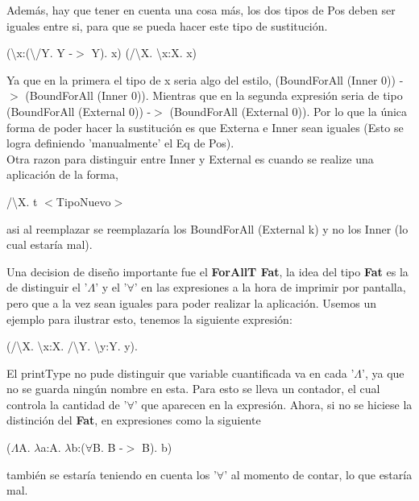 \documentclass[12pt, titlepage, a4paper]{article}
\begin{document}
\begin{itemize}[label=$\bullet$]
{  Además, hay que tener en cuenta una cosa más, los dos tipos de Pos deben ser iguales entre si, para que se pueda hacer este tipo 
  de sustitución.
  
  \begin{center}
    (\textbackslash x:(\textbackslash/Y. Y -$>$ Y). x) (/\textbackslash X. \textbackslash x:X. x)
  \end{center} 

  Ya que en la primera el tipo de x seria algo del estilo, (BoundForAll (Inner 0)) -$>$ (BoundForAll (Inner 0)). Mientras que en la segunda expresión seria 
  de tipo (BoundForAll (External 0)) -$>$ (BoundForAll (External 0)). Por lo que la única forma de poder hacer la sustitución es que Externa e Inner sean iguales (Esto 
  se logra definiendo 'manualmente' el Eq de Pos). \\

  Otra razon para distinguir entre Inner y External es cuando se realize una aplicación de la forma,
  \begin{center}
    /\textbackslash X. t $<$TipoNuevo$>$
  \end{center} 
   asi al reemplazar se reemplazaría los BoundForAll (External k) y no los Inner (lo cual estaría mal).
  }
  \end{itemize}

  Una decision de diseño importante fue el \textbf{ForAllT Fat}, la idea del tipo \textbf{Fat} es la de distinguir el 
  '$\Lambda$' y el '$\forall$' en las expresiones a la hora de imprimir por pantalla, pero que a la vez 
  sean iguales para poder realizar la aplicación. Usemos un ejemplo para ilustrar esto, tenemos la siguiente expresión:

  \begin{center}
    (/\textbackslash X. \textbackslash x:X. /\textbackslash Y. \textbackslash y:Y. y).
  \end{center} 

  El printType no pude distinguir que variable cuantificada va en cada '$\Lambda$', ya que no se guarda ningún 
  nombre en esta. Para esto se lleva un contador, 
  el cual controla la cantidad de '$\forall$' que aparecen en la expresión. Ahora, si no se hiciese la distinción 
  del \textbf{Fat}, en expresiones como la siguiente 

  \begin{center}
    ($\Lambda$A. $\lambda$a:A. $\lambda$b:($\forall$B. B -$>$ B). b)
  \end{center}  

  también se estaría teniendo en cuenta los '$\forall$' al momento de contar, lo que estaría mal.\\
\end{document}
